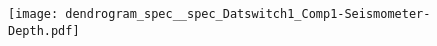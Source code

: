 \documentclass[varwidth, border=2pt]{standalone}
\begin{document}
\begin{figure}[htbp] 
   \texttt{[image: dendrogram\_spec\_\_spec\_Datswitch1\_Comp1-Seismometer-Depth.pdf]} 
\end{figure}
\end{document}
